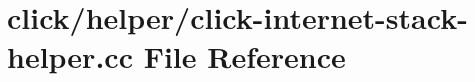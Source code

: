 \hypertarget{click-internet-stack-helper_8cc}{}\section{click/helper/click-\/internet-\/stack-\/helper.cc File Reference}
\label{click-internet-stack-helper_8cc}
